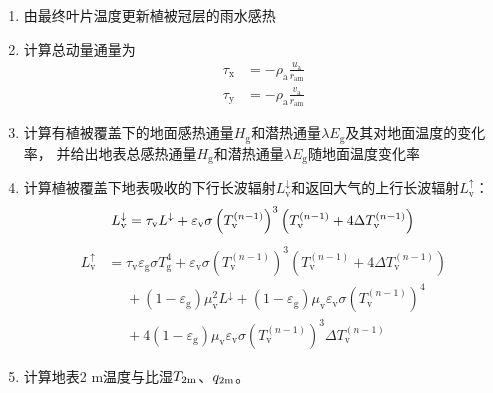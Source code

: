 \begin{enumerate}
  \item 由最终叶片温度更新植被冠层的雨水感热
  \item 计算总动量通量为
    \begin{equation}
      \begin{aligned}
        \tau_{\mathrm{x}} &=- \rho_{\mathrm{a}} \frac{u_{\mathrm{a}}}{r_{\mathrm{a m}}} \\[1ex]
        \tau_{\mathrm{y}} & =- \rho_{\mathrm{a}} \frac{v_{\mathrm{a}}}{r_{\mathrm{am}}}
      \end{aligned}
    \end{equation}
  \item 计算有植被覆盖下的地面感热通量$H_{\mathrm{g}}$和潜热通量$\lambda E_{\mathrm{g}}$及其对地面温度的变化率，
    并给出地表总感热通量$H_{\mathrm {g}} $和潜热通量$\lambda E_{\mathrm {g}} $随地面温度变化率
  \item 计算植被覆盖下地表吸收的下行长波辐射$L_{\mathrm{v}}^\downarrow$和返回大气的上行长波辐射$L_{\mathrm {v}}  ^\uparrow$：
    \begin{equation}
      L_{\mathrm{v}} ^\downarrow =  \tau_{\mathrm{v}} L ^\downarrow+\varepsilon_{\mathrm{v}}\sigma \left (T_{\mathrm{v}}^{(n - 1)}\right)^3\left( T_{\mathrm{v}}^{(n - 1)} + 4\Delta T_{\mathrm{v}}^{(n - 1)} \right)\\
    \end{equation}
    \begin{equation}
      \begin{aligned}
        L_{\mathrm{v}}^ \uparrow &=  \tau_{\mathrm{v}} \varepsilon_{\mathrm{g}} \sigma T_{\mathrm{g}}^{4}+ \varepsilon_{\mathrm{v}}\sigma \left ( T_{\mathrm{v}}^{(n - 1)}\right )^3\left( T_{\mathrm{v}}^{(n - 1)} + 4\Delta T_{\mathrm{v}}^{(n - 1)} \right) \\[1ex]
        &\mathrel{\phantom{=}} + \left ( 1- \varepsilon_{\mathrm{g}} \right)\mu_{\mathrm{v}}^2 L ^\downarrow + \left ( 1- \varepsilon_{\mathrm{g}} \right) \mu_{\mathrm{v}} \varepsilon_{\mathrm{v}} \sigma \left (T_{\mathrm{v}}^{(n - 1)}\right) ^4 \\[1ex]
        &\mathrel{\phantom{=}} + 4 \left ( 1- \varepsilon_{\mathrm{g}} \right) \mu_{\mathrm{v}} \varepsilon_{\mathrm{v}} \sigma \left (T_{\mathrm{v}}^{(n - 1)}\right)^3 \Delta T_{\mathrm{v}}^{(n - 1)}
      \end{aligned}
    \end{equation}
  \item 计算地表2 m温度与比湿$T_{\rm 2m}$、$q_{\rm 2m}$。
\end{enumerate}

